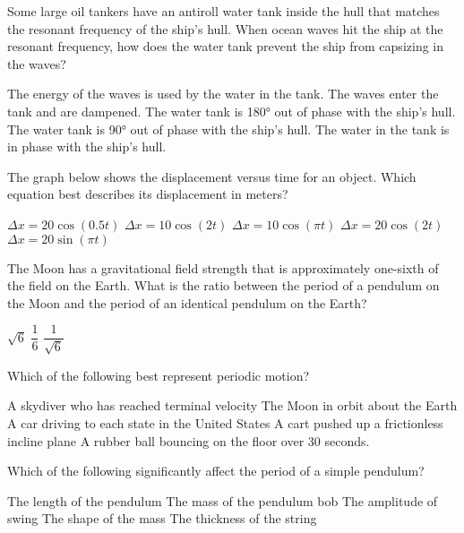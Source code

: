 \documentclass{../../../oss-ap12ibhl-print}
\begin{document}
\begin{questions}
  \question Some large oil tankers have an antiroll water tank inside the hull
  that matches the resonant frequency of the ship’s hull. When ocean waves hit
  the ship at the resonant frequency, how does the water tank prevent the ship
  from capsizing in the waves?
  \begin{choices}
    \choice The energy of the waves is used by the water in the tank.
    \choice The waves enter the tank and are dampened.
    \choice The water tank is \ang{180} out of phase with the ship's hull.
    \choice The water tank is \ang{90} out of phase with the ship's hull.
    \choice The water in the tank is in phase with the ship's hull.
  \end{choices}
  \newpage
  
  \question The graph below shows the displacement versus time for an object.
  Which equation best describes its displacement in meters?
  \begin{choices}
    \choice $\Delta x=20\cos(0.5t)$
    \choice $\Delta x=10\cos(2t)$
    \choice $\Delta x=10\cos(\pi t)$
    \choice $\Delta x=20\cos(2t)$
    \choice $\Delta x=20\sin(\pi t)$
  \end{choices}
    
  \question The Moon has a gravitational field strength that is approximately
  one-sixth of the field on the Earth. What is the ratio between the period
  of a pendulum on the Moon and the period of an identical pendulum on the
  Earth?
  \begin{choices}
    \choice $\sqrt{6}$
    \choice $\dfrac16$
    \choice $\dfrac1{\sqrt6}$
  \end{choices}

  \question Which of the following best represent periodic motion?
  \begin{choices}
    \choice A skydiver who has reached terminal velocity
    \choice The Moon in orbit about the Earth
    \choice A car driving to each state in the United States
    \choice A cart pushed up a frictionless incline plane
    \choice A rubber ball bouncing on the floor over 30 seconds.
  \end{choices}
    
  \question Which of the following significantly affect the period of a simple
  pendulum?
  \begin{choices}
    \choice The length of the pendulum
    \choice The mass of the pendulum bob
    \choice The amplitude of swing
    \choice The shape of the mass
    \choice The thickness of the string
  \end{choices}


\end{questions}
\end{document}
